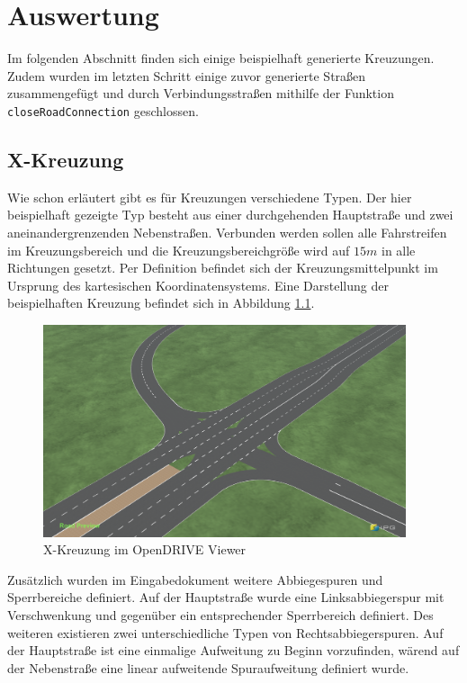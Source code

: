 \chapter{Auswertung}

Im folgenden Abschnitt finden sich einige beispielhaft generierte Kreuzungen. Zudem wurden im letzten Schritt einige zuvor generierte Straßen zusammengefügt und durch Verbindungsstraßen mithilfe der Funktion \texttt{closeRoadConnection} geschlossen.

\section{X-Kreuzung}
Wie schon erläutert gibt es für Kreuzungen verschiedene Typen. Der hier beispielhaft gezeigte Typ besteht aus einer durchgehenden Hauptstraße und zwei aneinandergrenzenden Nebenstraßen. Verbunden werden sollen alle Fahrstreifen im Kreuzungsbereich und die Kreuzungsbereichgröße wird auf \(15 m\) in alle Richtungen gesetzt. Per Definition befindet sich der Kreuzungsmittelpunkt im Ursprung des kartesischen Koordinatensystems. Eine Darstellung der beispielhaften Kreuzung befindet sich in Abbildung \ref{abb6}.

\begin{figure}[H]
\flushleft
\includegraphics[width=0.95\textwidth]{fig/junction4.png}
\caption{X-Kreuzung im OpenDRIVE Viewer}
\label{abb6}
\end{figure}

Zusätzlich wurden im Eingabedokument weitere Abbiegespuren und Sperrbereiche definiert. Auf der Hauptstraße wurde eine Linksabbiegerspur mit Verschwenkung und gegenüber ein entsprechender Sperrbereich definiert. Des weiteren existieren zwei unterschiedliche Typen von Rechtsabbiegerspuren. Auf der Hauptstraße ist eine einmalige Aufweitung zu Beginn vorzufinden, wärend auf der Nebenstraße eine linear aufweitende Spuraufweitung definiert wurde. 

